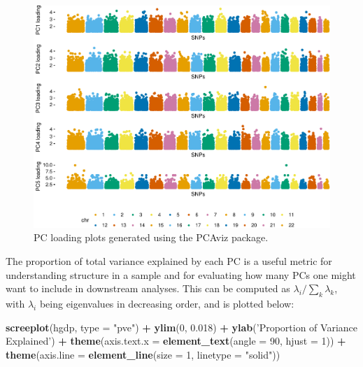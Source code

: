 \documentclass[smallextended]{svjour3}       %
\newenvironment{Shaded}{\begin{snugshade}}{\end{snugshade}}
\newcommand{\KeywordTok}[1]{\textcolor[rgb]{0.13,0.29,0.53}{\textbf{#1}}}
\newcommand{\DataTypeTok}[1]{\textcolor[rgb]{0.13,0.29,0.53}{#1}}
\newcommand{\DecValTok}[1]{\textcolor[rgb]{0.00,0.00,0.81}{#1}}
\newcommand{\FloatTok}[1]{\textcolor[rgb]{0.00,0.00,0.81}{#1}}
\newcommand{\StringTok}[1]{\textcolor[rgb]{0.31,0.60,0.02}{#1}}
\newcommand{\OperatorTok}[1]{\textcolor[rgb]{0.81,0.36,0.00}{\textbf{#1}}}
\newcommand{\NormalTok}[1]{#1}
\begin{document}
\begin{figure}
\includegraphics[width=1\linewidth]{plot/unnamed-chunk-22-1} \caption{PC loading plots generated using the PCAviz package.}\label{fig:unnamed-chunk-22}
\end{figure}

The proportion of total variance explained by each PC is a useful metric
for understanding structure in a sample and for evaluating how many PCs
one might want to include in downstream analyses. This can be computed
as \(\lambda_i / \sum_{k} \lambda_k\), with \(\lambda_i\) being
eigenvalues in decreasing order, and is plotted below:

\begin{Shaded}
\begin{Highlighting}[]
\KeywordTok{screeplot}\NormalTok{(hgdp, }\DataTypeTok{type =} \StringTok{"pve"}\NormalTok{) }\OperatorTok{+}\StringTok{ }
\StringTok{  }\KeywordTok{ylim}\NormalTok{(}\DecValTok{0}\NormalTok{, }\FloatTok{0.018}\NormalTok{) }\OperatorTok{+}
\StringTok{  }\KeywordTok{ylab}\NormalTok{(}\StringTok{'Proportion of Variance Explained'}\NormalTok{) }\OperatorTok{+}
\StringTok{  }\KeywordTok{theme}\NormalTok{(}\DataTypeTok{axis.text.x =} \KeywordTok{element_text}\NormalTok{(}\DataTypeTok{angle =} \DecValTok{90}\NormalTok{, }\DataTypeTok{hjust =} \DecValTok{1}\NormalTok{)) }\OperatorTok{+}
\StringTok{  }\KeywordTok{theme}\NormalTok{(}\DataTypeTok{axis.line =} \KeywordTok{element_line}\NormalTok{(}\DataTypeTok{size =} \DecValTok{1}\NormalTok{, }\DataTypeTok{linetype =} \StringTok{"solid"}\NormalTok{))}
\end{Highlighting}
\end{Shaded}
\end{document}
